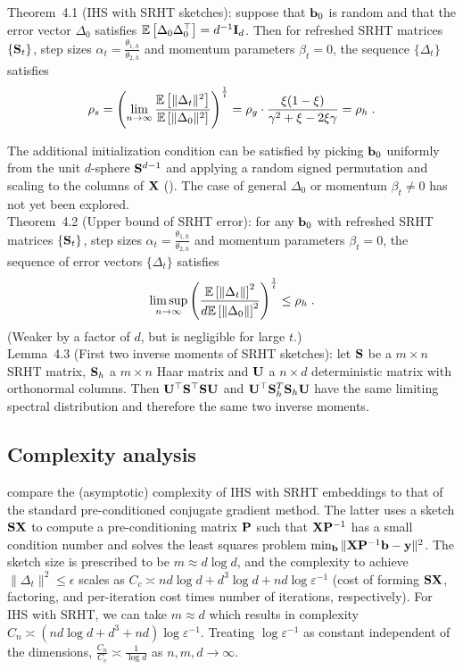 \documentclass[10pt]{article}
\begin{document}
Theorem~4.1 (IHS with SRHT sketches): suppose that $\mathbf{b}_0$ is random and that the error vector $\Delta_0$ satisfies $\mathbb{E}\left[\Delta_0\Delta_0^\top\right]=d^{-1}\mathbf{I}_d$. Then for refreshed SRHT matrices $\{\mathbf{S}_t\}$, step sizes $\alpha_t=\frac{\theta_{1,h}}{\theta_{2,h}}$ and momentum parameters $\beta_t=0$,  the sequence $\{\Delta_t\}$ satisfies
\[
\rho_s = \left(\lim_{n\rightarrow\infty}\frac{\mathbb{E}\left[\|\Delta_t\|^2\right]}{\mathbb{E}\left[\|\Delta_0\|^2\right]}\right)^\frac{1}{t} = \rho_g \cdot \frac{\xi(1-\xi)}{\gamma^2+\xi-2\xi\gamma} = \rho_h \;.
\]

The additional initialization condition can be satisfied by picking $\mathbf{b}_0$ uniformly from the unit $d$-sphere $\mathbf{S}^{d-1}$ and applying a random signed permutation and scaling to the columns of $\mathbf{X}$ (\todo). The case of general $\Delta_0$ or momentum $\beta_t\neq 0$ has not yet been explored.
\\

Theorem~4.2 (Upper bound of SRHT error): for any $\mathbf{b}_0$ with refreshed SRHT matrices $\{\mathbf{S}_t\}$, step sizes $\alpha_t=\frac{\theta_{1,h}}{\theta_{2,h}}$ and momentum parameters $\beta_t=0$, the sequence of error vectors $\{\Delta_t\}$ satisfies
\[
\limsup_{n\rightarrow\infty} \left(\frac{\mathbb{E}\left[\|\Delta_t\|\right]^2}{d\mathbb{E}\left[\|\Delta_0\|\right]^2}\right)^\frac{1}{t} \leq \rho_h \;.
\]
(Weaker by a factor of $d$, but is negligible for large $t$.)
\\

Lemma~4.3 (First two inverse moments of SRHT sketches): let $\mathbf{S}$ be a $m\times n$ SRHT matrix, $\mathbf{S}_h$ a $m\times n$ Haar matrix and $\mathbf{U}$ a $n\times d$ deterministic matrix with orthonormal columns. Then $\mathbf{U}^\top\mathbf{S}^\top\mathbf{S}\mathbf{U}$ and $\mathbf{U}^\top\mathbf{S}_h^T\mathbf{S}_h\mathbf{U}$ have the same limiting spectral distribution and therefore the same two inverse moments.


\subsection{Complexity analysis}

\citet{Lacotte:2020} compare the (asymptotic) complexity of IHS with SRHT embeddings to that of the standard pre-conditioned conjugate gradient method. The latter uses a sketch $\mathbf{S}\mathbf{X}$ to compute a pre-conditioning matrix $\mathbf{P}$ such that $\mathbf{X}\mathbf{P}^{-1}$ has a small condition number and solves the least squares problem $\min_{\mathbf{b}}\|\mathbf{X}\mathbf{P}^{-1}\mathbf{b}-\mathbf{y}\|^2$. The sketch size is prescribed to be $m\approx d\log d$, and the complexity to achieve $\|\Delta_t\|^2\leq \epsilon$ scales as $C_c\asymp nd\log d+d^3\log d+nd\log\varepsilon^{-1}$ (cost of forming $\mathbf{S}\mathbf{X}$, factoring, and per-iteration cost times number of iterations, respectively). For IHS with SRHT, we can take $m\approx d$ which results in complexity $C_n\asymp (nd\log d+d^3+nd)\log\varepsilon^{-1}$. Treating $\log\varepsilon^{-1}$ as constant independent of the dimensions, $\frac{C_n}{C_c}\asymp \frac{1}{\log d}$ as $n,m,d\rightarrow\infty$.
\end{document}
